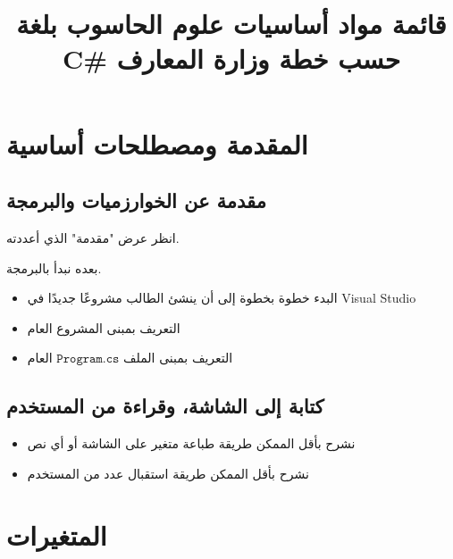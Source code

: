 ﻿\documentclass[14pt]{extarticle}
\title{قائمة مواد أساسيات علوم الحاسوب بلغة C\# حسب خطة وزارة المعارف}
\begin{document}
\maketitle
\thispagestyle{fancy}


\renewcommand{\contentsname}{جدول المحتويات}
\tableofcontents
\clearpage


\section{المقدمة ومصطلحات أساسية}

\subsection{مقدمة عن الخوارزميات والبرمجة}

انظر عرض "مقدمة" الذي أعددته.

بعده نبدأ بالبرمجة.

\begin{itemize}
\item البدء خطوة بخطوة إلى أن ينشئ الطالب مشروعًا جديدًا في Visual Studio
\item التعريف بمبنى المشروع العام
\item التعريف بمبنى الملف $\mathtt{Program.cs}$ العام
\end{itemize}

\subsection{كتابة إلى الشاشة، وقراءة من المستخدم}

\begin{itemize}
    \item نشرح بأقل الممكن طريقة طباعة متغير على الشاشة أو أي نص
    \item نشرح بأقل الممكن طريقة استقبال عدد من المستخدم
\end{itemize}

\clearpage
\section{المتغيرات}
\end{document}
